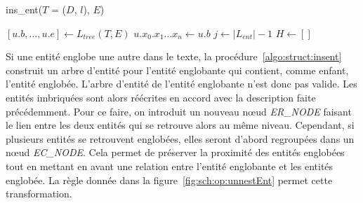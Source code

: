 \begin{procedure}[htb]
    \caption{ins\_ent($T$ = ($D$, $l$), $E$)}
    \label{algo:struct:insent}


    $[u.b, \dots, u.e] \gets L_{tree}(T, E)$\;
    $u.x_0.x_1 \dots x_n \gets u.b$ 
     
    $j \gets |L_{ent}| - 1$\;
    $H \gets []$\;
    \label{algo:struct:insent:add}\;
\end{procedure}

Si une entité englobe une autre dans le texte, la procédure~\ref{algo:struct:insent} construit un arbre d'entité pour l'entité englobante qui contient, comme enfant, l'entité englobée.
L'arbre d'entité de l'entité englobante n'est donc pas valide.
Les entités imbriquées sont alors réécrites en accord avec la description faite précédemment.
Pour ce faire, on introduit un nouveau nœud \emph{ER\_NODE} faisant le lien entre les deux entités qui se retrouve alors au même niveau.
Cependant, si plusieurs entités se retrouvent englobées, elles seront d'abord regroupées dans un nœud \emph{EC\_NODE}.
Cela permet de préserver la proximité des entités englobées tout en mettant en avant une relation entre l'entité englobante et les entités englobée.
La règle donnée dans la figure~\ref{fig:sch:op:unnestEnt} permet cette transformation.

